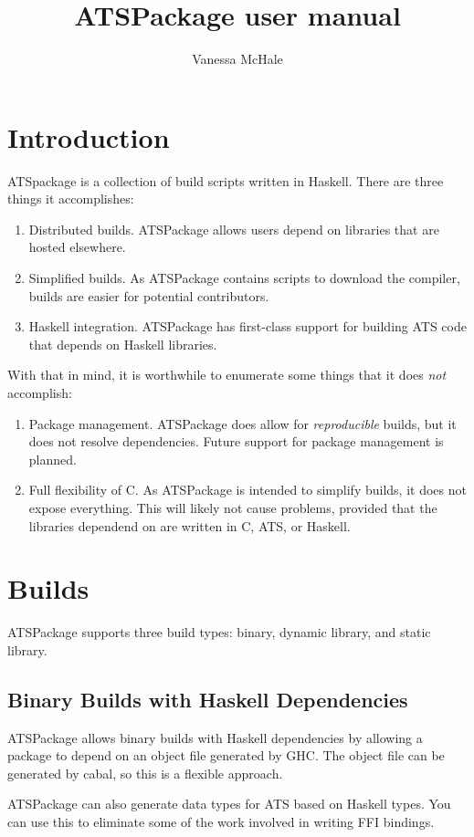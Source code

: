 \documentclass{article}
\begin{document}
\title{ATSPackage user manual}
\author{Vanessa McHale}
\maketitle

\tableofcontents

\section{Introduction}

ATSpackage is a collection of build scripts written in Haskell. There are three
things it accomplishes:

\begin{enumerate}
  \item Distributed builds. ATSPackage allows users depend on libraries that are
    hosted elsewhere.
  \item Simplified builds. As ATSPackage contains scripts to download the
    compiler, builds are easier for potential contributors.
  \item Haskell integration. ATSPackage has first-class support for building ATS
    code that depends on Haskell libraries. 
\end{enumerate}

With that in mind, it is worthwhile to enumerate some things that it does
\textit{not} accomplish:

\begin{enumerate}
  \item Package management. ATSPackage does allow for \textit{reproducible}
    builds, but it does not resolve dependencies. Future support for package
    management is planned.
  \item Full flexibility of C. As ATSPackage is intended to simplify builds, it
    does not expose everything. This will likely not cause problems, provided
    that the libraries dependend on are written in C, ATS, or Haskell.
\end{enumerate}

\section{Builds}

ATSPackage supports three build types: binary, dynamic library, and static
library.

\subsection{Binary Builds with Haskell Dependencies}

ATSPackage allows binary builds with Haskell dependencies by allowing a package
to depend on an object file generated by GHC. The object file can be generated
by cabal, so this is a flexible approach.

ATSPackage can also generate data types for ATS based on Haskell types. You can
use this to eliminate some of the work involved in writing FFI bindings.
\end{document}

